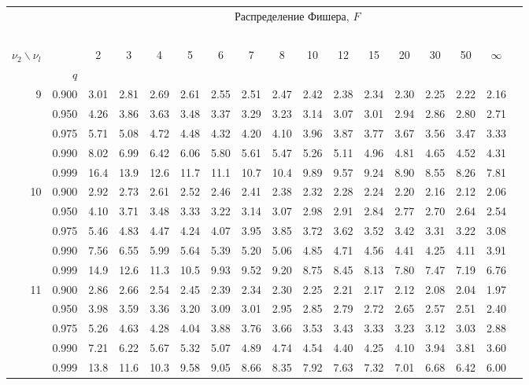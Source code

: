 {\newpage


\begin{center}
\begin{tabular}{rrr@{\,}r@{\,}r@{\,}r@{\,}r@{\,}r@{\,}r@{\,}r
                   @{\,}r@{\,}r@{\,}r@{\,}r@{\,}r@{\,}r@{\,}r}
&&\multicolumn{14}{c}{Распределение Фишера, $F$}\\
\ \\
$\nu_2\backslash\nu_l$ & & 
\multicolumn{1}{c}{2} &\multicolumn{1}{c}{3} &
\multicolumn{1}{c}{4} &\multicolumn{1}{c}{5} &
\multicolumn{1}{c}{6} &\multicolumn{1}{c}{7} &
\multicolumn{1}{c}{8} &\multicolumn{1}{c}{10}&
\multicolumn{1}{c}{12}&\multicolumn{1}{c}{15}&
\multicolumn{1}{c}{20}&\multicolumn{1}{c}{30}&
\multicolumn{1}{c}{50}&\multicolumn{1}{c}{$\infty$}\\
& $q$ \\
 9&0.900&3.01&2.81&2.69&2.61&2.55&2.51&2.47&2.42&2.38&2.34&2.30&2.25&2.22&2.16\\
  &0.950&4.26&3.86&3.63&3.48&3.37&3.29&3.23&3.14&3.07&3.01&2.94&2.86&2.80&2.71\\
  &0.975&5.71&5.08&4.72&4.48&4.32&4.20&4.10&3.96&3.87&3.77&3.67&3.56&3.47&3.33\\
  &0.990&8.02&6.99&6.42&6.06&5.80&5.61&5.47&5.26&5.11&4.96&4.81&4.65&4.52&4.31\\
  &0.999&16.4&13.9&12.6&11.7&11.1&10.7&10.4&9.89&9.57&9.24&8.90&8.55&8.26&7.81\\
10&0.900&2.92&2.73&2.61&2.52&2.46&2.41&2.38&2.32&2.28&2.24&2.20&2.16&2.12&2.06\\
  &0.950&4.10&3.71&3.48&3.33&3.22&3.14&3.07&2.98&2.91&2.84&2.77&2.70&2.64&2.54\\
  &0.975&5.46&4.83&4.47&4.24&4.07&3.95&3.85&3.72&3.62&3.52&3.42&3.31&3.22&3.08\\
  &0.990&7.56&6.55&5.99&5.64&5.39&5.20&5.06&4.85&4.71&4.56&4.41&4.25&4.11&3.91\\
  &0.999&14.9&12.6&11.3&10.5&9.93&9.52&9.20&8.75&8.45&8.13&7.80&7.47&7.19&6.76\\
11&0.900&2.86&2.66&2.54&2.45&2.39&2.34&2.30&2.25&2.21&2.17&2.12&2.08&2.04&1.97\\
  &0.950&3.98&3.59&3.36&3.20&3.09&3.01&2.95&2.85&2.79&2.72&2.65&2.57&2.51&2.40\\
  &0.975&5.26&4.63&4.28&4.04&3.88&3.76&3.66&3.53&3.43&3.33&3.23&3.12&3.03&2.88\\
  &0.990&7.21&6.22&5.67&5.32&5.07&4.89&4.74&4.54&4.40&4.25&4.10&3.94&3.81&3.60\\
  &0.999&13.8&11.6&10.3&9.58&9.05&8.66&8.35&7.92&7.63&7.32&7.01&6.68&6.42&6.00\\

\end{tabular}
\end{center}}

